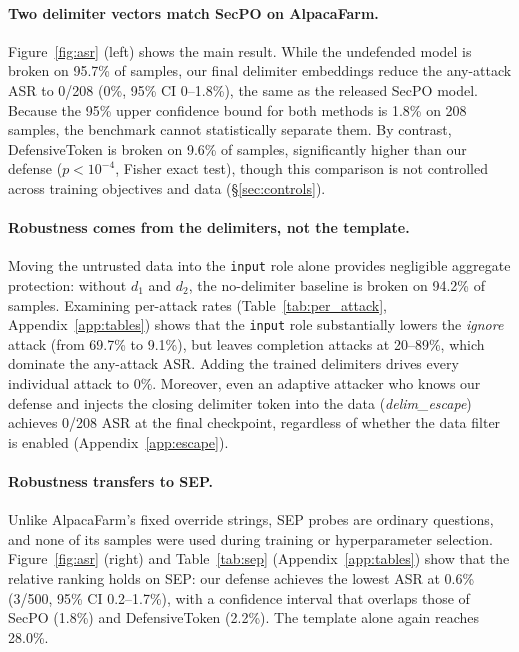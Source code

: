 \documentclass{article}
\begin{document}
\paragraph{Two delimiter vectors match SecPO on AlpacaFarm.} Figure~\ref{fig:asr} (left) shows the main result. While the undefended model is broken on 95.7\% of samples, our final delimiter embeddings reduce the any-attack ASR to 0/208 (0\%, 95\% CI 0--1.8\%), the same as the released SecPO model. Because the 95\% upper confidence bound for both methods is 1.8\% on 208 samples, the benchmark cannot statistically separate them. By contrast, DefensiveToken is broken on 9.6\% of samples, significantly higher than our defense ($p < 10^{-4}$, Fisher exact test), though this comparison is not controlled across training objectives and data (\S\ref{sec:controls}).

\paragraph{Robustness comes from the delimiters, not the template.} Moving the untrusted data into the \texttt{input} role alone provides negligible aggregate protection: without $d_1$ and $d_2$, the no-delimiter baseline is broken on 94.2\% of samples. Examining per-attack rates (Table~\ref{tab:per_attack}, Appendix~\ref{app:tables}) shows that the \texttt{input} role substantially lowers the \emph{ignore} attack (from 69.7\% to 9.1\%), but leaves completion attacks at 20--89\%, which dominate the any-attack ASR. Adding the trained delimiters drives every individual attack to 0\%. Moreover, even an adaptive attacker who knows our defense and injects the closing delimiter token into the data (\emph{delim\_escape}) achieves 0/208 ASR at the final checkpoint, regardless of whether the data filter is enabled (Appendix~\ref{app:escape}).

\paragraph{Robustness transfers to SEP.} Unlike AlpacaFarm's fixed override strings, SEP probes are ordinary questions, and none of its samples were used during training or hyperparameter selection. Figure~\ref{fig:asr} (right) and Table~\ref{tab:sep} (Appendix~\ref{app:tables}) show that the relative ranking holds on SEP: our defense achieves the lowest ASR at 0.6\% (3/500, 95\% CI 0.2--1.7\%), with a confidence interval that overlaps those of SecPO (1.8\%) and DefensiveToken (2.2\%). The template alone again reaches 28.0\%.
\end{document}
